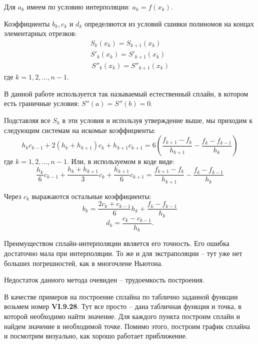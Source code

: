 		Для $a_k$ имеем по условию интерполяции: $a_k = f(x_k)$.
	
		Коэффициенты $b_k, c_k$ и $d_k$ определяются из условий сшивки полиномов на концах элементарных отрезков:
		\begin{eqnarray*}
			S_k(x_k) = S_{k + 1}(x_k) \\ 
			S'_k(x_k) = S'_{k+1}(x_k) \\
			\, S''_k(x_k) = S''_{k+1}(x_k)
		\end{eqnarray*}
		\noindent где $k = 1, 2, \ldots, n-1$.
		
		В данной работе используется так называемый естественный сплайн, в котором есть граничные условия: $S''(a) = S''(b) = 0$.
		
		Подставляя все $S_k$ в эти условия и используя утверждение выше, мы приходим к следующим системам на искомые коэффициенты:
		\begin{equation*}
			h_k c_{k-1} + 2(h_k + h_{k+1})c_k + h_{k+1}c_{k+1} = 6\left(\frac{f_{k+1} - f_k}{h_{k+1}} - \frac{f_k - f_{k-1}}{h_k}\right)
		\end{equation*}
		\noindent где $k = 1, 2, \ldots, n-1$. Или, в используемом в коде виде:
		\begin{equation*}
			\frac{h_k}{6} c_{k-1} + \frac{h_k + h_{k+1}}{3}c_k + \frac{h_{k+1}}{6}c_{k+1} = \frac{f_{k+1} - f_k}{h_{k+1}} - \frac{f_k - f_{k-1}}{h_k}
		\end{equation*}
		
		Через $c_k$ выражаются остальные коэффициенты:
		\begin{equation*}
			b_k = \frac{2 c_k + c_{k-1}}{6}h_k + \frac{f_k - f_{k-1}}{h_k}
		\end{equation*}
		\begin{equation*}
			d_k = \frac{c_k - c_{k-1}}{h_k}.
		\end{equation*}
		
		Преимуществом сплайн-интерполяции является его точность. Его ошибка достаточно мала при интерполяции. То же и для экстраполяции -- тут уже нет больших погрешностей, как в многочлене Ньютона.
		
		Недостаток данного метода очевиден -- трудоемкость построения.
		
		
		В качестве примеров на построение сплайна по таблично заданной функции возьмем номер \textbf{VI.9.28}. Тут все просто -- дана табличная функция и точка, в которой необходимо найти значение. Для каждого пункта построим сплайн и найдем значение в необходимой точке. Помимо этого, построим график сплайна и посмотрим визуально, как хорошо работает приближение.

